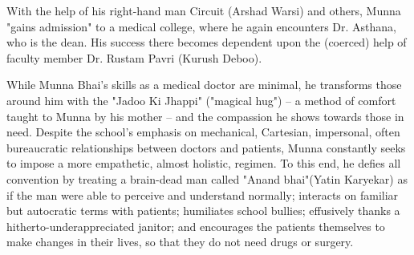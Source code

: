 With the help of his right-hand man Circuit (Arshad Warsi) and others, Munna "gains admission" to a medical college, where he again encounters Dr. Asthana, who is the dean. His success there becomes dependent upon the (coerced) help of faculty member Dr. Rustam Pavri (Kurush Deboo).

While Munna Bhai's skills as a medical doctor are minimal, he transforms those around him with the "Jadoo Ki Jhappi" ("magical hug") – a method of comfort taught to Munna by his mother – and the compassion he shows towards those in need. Despite the school's emphasis on mechanical, Cartesian, impersonal, often bureaucratic relationships between doctors and patients, Munna constantly seeks to impose a more empathetic, almost holistic, regimen. To this end, he defies all convention by treating a brain-dead man called "Anand bhai"(Yatin Karyekar) as if the man were able to perceive and understand normally; interacts on familiar but autocratic terms with patients; humiliates school bullies; effusively thanks a hitherto-underappreciated janitor; and encourages the patients themselves to make changes in their lives, so that they do not need drugs or surgery.
